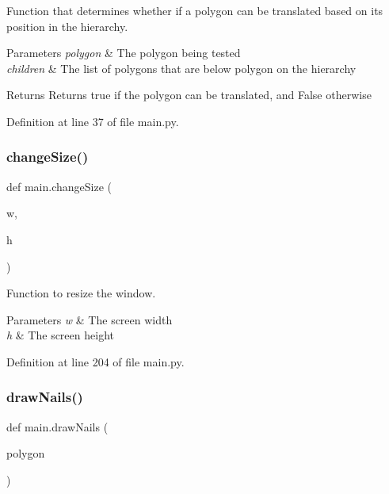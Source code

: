 Function that determines whether if a polygon can be translated based on its position in the hierarchy. 


\begin{DoxyParams}{Parameters}
{\em polygon} & The polygon being tested \\
\hline
{\em children} & The list of polygons that are below polygon on the hierarchy \\
\hline
\end{DoxyParams}
\begin{DoxyReturn}{Returns}
Returns true if the polygon can be translated, and False otherwise 
\end{DoxyReturn}


Definition at line 37 of file main.\+py.

\mbox{\label{namespacemain_a526cfe84f4e80095febf0d3f4b7b5358}} 
\subsubsection{\texorpdfstring{change\+Size()}{changeSize()}}
{\footnotesize\ttfamily def main.\+change\+Size (\begin{DoxyParamCaption}\item[{}]{w,  }\item[{}]{h }\end{DoxyParamCaption})}



Function to resize the window. 


\begin{DoxyParams}{Parameters}
{\em w} & The screen width \\
\hline
{\em h} & The screen height \\
\hline
\end{DoxyParams}


Definition at line 204 of file main.\+py.

\mbox{\label{namespacemain_a020b084aad026564a4c7ee5af1ac6b91}} 
\subsubsection{\texorpdfstring{draw\+Nails()}{drawNails()}}
{\footnotesize\ttfamily def main.\+draw\+Nails (\begin{DoxyParamCaption}\item[{}]{polygon }\end{DoxyParamCaption})}



